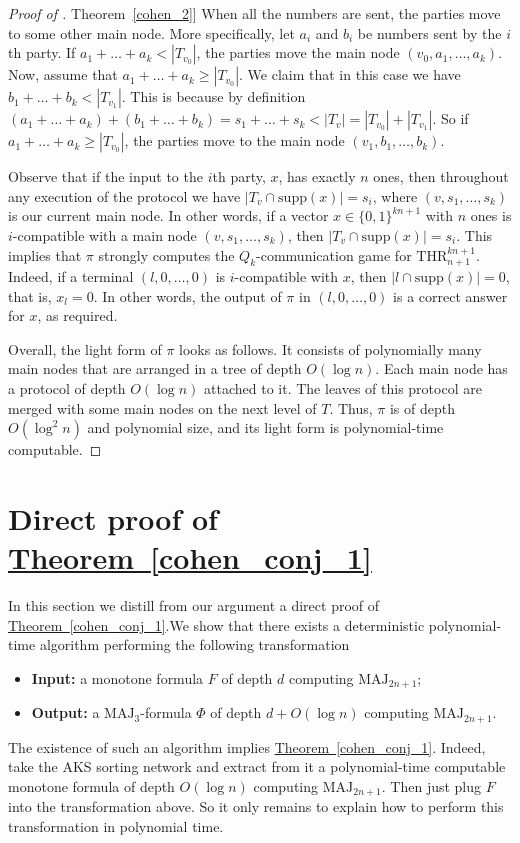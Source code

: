 \documentclass[11pt]{article}
\numberwithin{equation}{section}
\theoremstyle{definition}
\theoremstyle{plain}
\newcommand{\expref}[2]{\hyperref[#2]{#1~\ref{#2}}}
\def\MAJ{\mathrm{MAJ}}
\def\THR{\mathrm{THR}}
\begin{document}
\begin{proof}[Proof of \expref{Theorem}{cohen_2}]
When all the numbers are sent, the parties move to some other main node. More specifically, let $a_i$ and $b_i$ be numbers sent by the $i$th party. If $a_1 + \ldots + a_k < |T_{v_0}|$, the parties move the main node $(v_0, a_1, \ldots, a_k)$. Now, assume that $a_1 + \ldots + a_k \ge |T_{v_0}|$. We claim that in this case we have $b_1 + \ldots + b_k < |T_{v_1}|$. This is because by definition $(a_1 + \ldots + a_k) + (b_1 + \ldots + b_k) = s_1 + \ldots + s_k < |T_v| = |T_{v_0}| + |T_{v_1}|$. So if $a_1 + \ldots + a_k \ge |T_{v_0}|$, the parties move to the main node $(v_1, b_1, \ldots, b_k)$.

Observe that if the input to the $i$th party, $x$, has exactly $n$ ones, then throughout any execution of the protocol we have $|T_v\cap\mathrm{supp}(x)| = s_i$, where $(v, s_1, \ldots, s_k)$ is our current main node. In other words, if a vector $x\in\{0, 1\}^{kn + 1}$ with $n$ ones is $i$-compatible with a main node $(v, s_1, \ldots, s_k)$, then $|T_{v}\cap\mathrm{supp}(x)| = s_i$.  This implies that $\pi$ strongly computes the $Q_k$-communication game for $\THR^{kn+1}_{n+1}$. Indeed, if a terminal $(l, 0, \ldots, 0)$ is $i$-compatible with $x$, then $|{l}\cap \mathrm{supp}(x)| = 0$, that is, $x_l = 0$.  In other words, the output of $\pi$ in $(l, 0, \ldots, 0)$ is a correct answer for $x$, as required.




Overall, the light form of $\pi$ looks as follows. 
It consists of polynomially many main nodes that are arranged in 
%
a tree of depth $O(\log n)$.  %
Each main node has %
a protocol of depth $O(\log n)$  %
attached to it. %
The leaves  %
of this protocol are merged with some main nodes on the next level of $T$. Thus, $\pi$ is of depth $O(\log^2 n)$ and polynomial size, and its light form is polynomial-time computable.
\end{proof}







\section{Direct proof of \expref{Theorem}{cohen_conj_1}}
\label{sec:direct}
In this section we distill from our argument a direct proof of \expref{Theorem}{cohen_conj_1}.We show that there exists a deterministic polynomial-time algorithm performing the following transformation
\begin{itemize}
\item \textbf{Input:} a monotone formula $F$ of depth $d$  computing $\MAJ_{2n + 1}$;
\item \textbf{Output:} a $\MAJ_3$-formula $\Phi$ of depth $d + O(\log n)$ computing $\MAJ_{2n + 1}$.
\end{itemize}
The existence of such an algorithm implies \expref{Theorem}{cohen_conj_1}. Indeed, take the AKS sorting network and extract from it a polynomial-time computable %
monotone formula of depth $O(\log n)$  %
computing $\MAJ_{2n + 1}$. Then just 
%
plug $F$  %
into the transformation above. So it only remains to explain how to perform this transformation in polynomial time.
\end{document}
